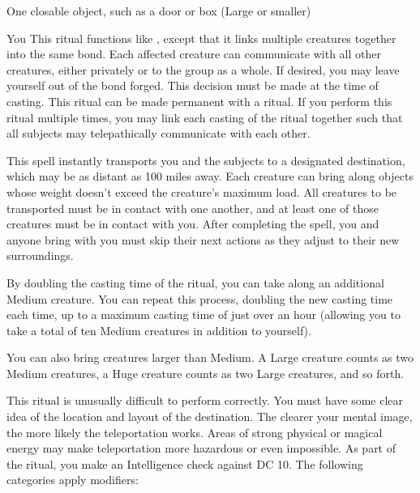 \begin{spelltarget}{One closable object, such as a door or box (Large or smaller)}
\begin{spelltarget}{You}
\spelleffect This ritual functions like , except that it links multiple creatures together into the same bond. Each affected creature can communicate with all other creatures, either privately or to the group as a whole. If desired, you may leave yourself out of the bond forged. This decision must be made at the time of casting.
\spellnotes This ritual can be made permanent with a  ritual. If you perform this ritual multiple times, you may link each casting of the ritual together such that all subjects may telepathically communicate with each other. 

\spelleffect This spell instantly transports you and the subjects to a designated destination, which may be as distant as 100 miles away. Each creature can bring along objects whose weight doesn't exceed the creature's maximum load. All creatures to be transported must be in contact with one another, and at least one of those creatures must be in contact with you. After completing the spell, you and anyone bring with you must skip their next actions as they adjust to their new surroundings.
\par By doubling the casting time of the ritual, you can take along an additional Medium creature. You can repeat this process, doubling the new casting time each time, up to a maximum casting time of just over an hour (allowing you to take a total of ten Medium creatures in addition to yourself).
\par You can also bring creatures larger than Medium. A Large creature counts as two Medium creatures, a Huge creature counts as two Large creatures, and so forth.
\par This ritual is unusually difficult to perform correctly. You must have some clear idea of the location and layout of the destination. The clearer your mental image, the more likely the teleportation works. Areas of strong physical or magical energy may make teleportation more hazardous or even impossible. As part of the ritual, you make an Intelligence check against DC 10. The following categories apply modifiers:

\end{spelltarget}
\end{spelltarget}
